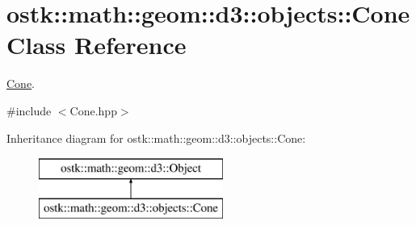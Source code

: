 \hypertarget{classostk_1_1math_1_1geom_1_1d3_1_1objects_1_1_cone}{}\section{ostk\+:\+:math\+:\+:geom\+:\+:d3\+:\+:objects\+:\+:Cone Class Reference}
\label{classostk_1_1math_1_1geom_1_1d3_1_1objects_1_1_cone}


\hyperlink{classostk_1_1math_1_1geom_1_1d3_1_1objects_1_1_cone}{Cone}.  




{\ttfamily \#include $<$Cone.\+hpp$>$}

Inheritance diagram for ostk\+:\+:math\+:\+:geom\+:\+:d3\+:\+:objects\+:\+:Cone\+:\begin{figure}[H]
\begin{center}
\leavevmode
\includegraphics[height=2.000000cm]{classostk_1_1math_1_1geom_1_1d3_1_1objects_1_1_cone}
\end{center}
\end{figure}
